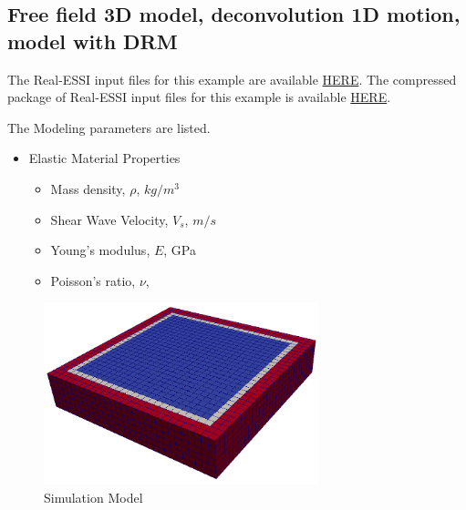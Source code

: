 \subsection{Free field 3D model, deconvolution 1D motion, model with DRM}
\label{Free_fields_3D_model_with_DRM1}


The Real-ESSI input files for this example are available 
\href{http://sokocalo.engr.ucdavis.edu/~jeremic/Real_ESSI_Simulator/Real_ESSI_Short_Course_Examples_Dec2017/short-course-examples/Day2/Deconvolution_1D_Motions/Free_fields_3D_model_with_DRM}{HERE}. 
The compressed package of Real-ESSI input files for this example is available 
\href{http://sokocalo.engr.ucdavis.edu/~jeremic/Real_ESSI_Simulator/Real_ESSI_Short_Course_Examples_Dec2017/short-course-examples/Day2/Deconvolution_1D_Motions/Free_fields_3D_model_with_DRM/_all_files_packaged_for_Free_fields_3D_model_with_DRM.tar.gz}{HERE}. 

The Modeling parameters are listed.
\begin{itemize}
  \item Elastic Material Properties 
  \begin{itemize}
    \item Mass density, $\rho$, \enspace {} $kg/m^3$
    \item Shear Wave Velocity, $V_s$, \enspace {} $m/s$
    \item Young's modulus, $E$, \enspace {} GPa
    \item Poisson's ratio, $\nu$, \enspace {}
  \end{itemize}
\end{itemize}


\begin{figure}[H]
  \centering
  \includegraphics[width = 8cm]{./Figure-files/Day2/Deconvolution_1D_Motions/Free_fields_3D_model_with_DRM/overview.png}
  \caption{Simulation Model}
  \label{fig_decon_1D_motion_3D_model1}
\end{figure}


